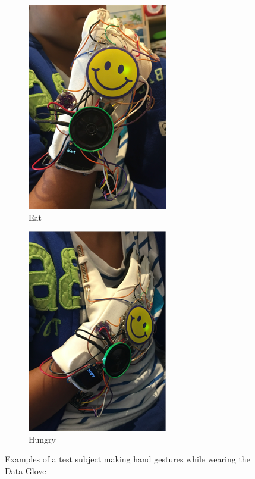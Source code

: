 \begin{figure}
    \centering
    \begin{subfigure}{.4\linewidth}
        \centering
        \setlength\figureheight{\linewidth}
        \setlength\figurewidth{\linewidth}
        \includegraphics{./assets/img/Eat}
        \caption{Eat}
        \label{fig:eat}
    \end{subfigure}
    \begin{subfigure}{.4\linewidth}
        \centering
        \setlength\figureheight{\linewidth}
        \setlength\figurewidth{\linewidth}
        \includegraphics{./assets/img/Hungry}
        \caption{Hungry}
        \label{fig:hungry}
    \end{subfigure}
    \caption{Examples of a test subject making hand gestures while wearing the Data Glove}
    \label{fig:examplegestures2}
\end{figure}



